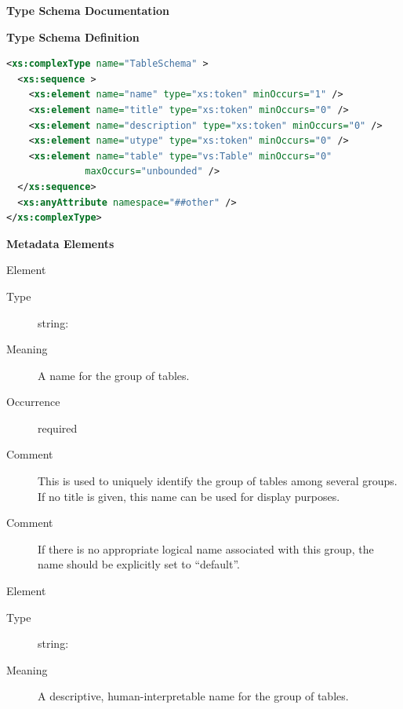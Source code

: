 \documentclass[11pt,a4paper]{ivoa}
\begin{document}
\begin{generated}
\begingroup
        \renewcommand*\descriptionlabel[1]{%
        \hbox to 5.5em{\emph{#1}\hfil}}\vspace{2ex}\noindent\textbf{ Type Schema Documentation}


\vspace{1ex}\noindent\textbf{ Type Schema Definition}

\begin{lstlisting}[language=XML,basicstyle=\footnotesize]
<xs:complexType name="TableSchema" >
  <xs:sequence >
    <xs:element name="name" type="xs:token" minOccurs="1" />
    <xs:element name="title" type="xs:token" minOccurs="0" />
    <xs:element name="description" type="xs:token" minOccurs="0" />
    <xs:element name="utype" type="xs:token" minOccurs="0" />
    <xs:element name="table" type="vs:Table" minOccurs="0"
              maxOccurs="unbounded" />
  </xs:sequence>
  <xs:anyAttribute namespace="##other" />
</xs:complexType>
\end{lstlisting}

\vspace{0.5ex}\noindent\textbf{ Metadata Elements}

\begingroup\small\begin{bigdescription}\item[Element \xmlel{name}]
\begin{description}
\item[Type] string: 
\item[Meaning]
               A name for the group of tables.

\item[Occurrence] required
\item[Comment]
               This is used to uniquely identify the group of tables among
               several groups.  If no title is given, this
               name can be used for display purposes.

\item[Comment]
               If there is no appropriate logical name associated with
               this group, the name should be explicitly set to
               “default”.


\end{description}
\item[Element \xmlel{title}]
\begin{description}
\item[Type] string: 
\item[Meaning]
                  A descriptive, human-interpretable name for the group of
                  tables.


\end{description}
\end{bigdescription}
\end{generated}
\end{document}
